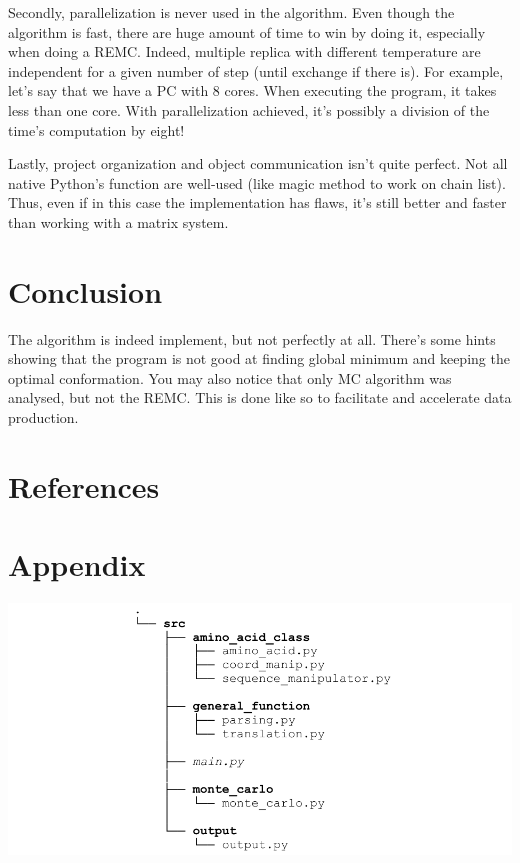 \documentclass[12pt, oneside, a4paper]{report}
\begin{document}
\begin{multicols}{2}
Secondly, parallelization is never used in the algorithm. Even though the algorithm is fast, there are huge amount of time to win by doing it, especially when doing a REMC. Indeed, multiple replica with different temperature are independent for a given number of step (until exchange if there is). For example, let's say that we have a PC with 8 cores. When executing the program, it takes less than one core. With parallelization achieved, it's possibly a division of the time's computation by eight!

Lastly, project organization and object communication isn't quite perfect. Not all native Python's function are well-used (like magic method to work on chain list). Thus, even if in this case the implementation has flaws, it's still better and faster than working with a matrix system.

\section{Conclusion}
The algorithm is indeed implement, but not perfectly at all. There's some hints showing that the program is not good at finding global minimum and keeping the optimal conformation. You may also notice that only MC algorithm was analysed, but not the REMC. This is done like so to facilitate and accelerate data production.

\section{References}
\begingroup
    \renewcommand{\chapter}[2]{}%

    
    
\endgroup
\end{multicols}

\pagebreak
\section*{Appendix}
\renewcommand\thefigure{\Roman{figure}}
\setcounter{figure}{0}

\begingroup
    \includegraphics[width=\textwidth]{figure/tree.pdf}
\end{document}
